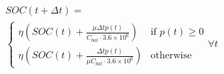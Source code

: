 \begin{equation}
\begin{split}
	&SOC(t+\Delta t) =\\
	&\begin{cases}
		\eta \left(SOC(t) + \frac{\mu \Delta t p(t)}{C_{bat}\cdot3.6\times10^6}\right) &\text{if } p(t) \geq 0\\
		\eta \left(SOC(t) + \frac{\Delta t p(t)}{\mu C_{bat}\cdot3.6\times10^6}\right) &\text{otherwise}
	\end{cases}
	\forall t
\end{split}
	\label{ch2:equ:battery-model-equation}
\end{equation}